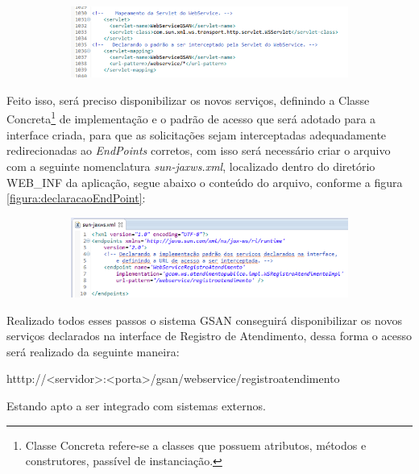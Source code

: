 \begin{figure}[H]
	\centering
	\caption{\textbf{Declaração da servlet do Webservice.}}	
	\label{figura:declaracaoServlet}
	\begin{subfigure}[H]{\textwidth}
		\centering
		\includegraphics{figuras/declarando_servlet.png}
	\end{subfigure}
\end{figure}

Feito isso, será preciso disponibilizar os novos serviços, definindo a Classe Concreta\footnote{Classe Concreta refere-se a classes que possuem atributos, métodos e construtores, passível de instanciação.} de implementação e o padrão de acesso que será adotado para a interface criada, para que as solicitações sejam interceptadas adequadamente redirecionadas ao \textit{EndPoints} corretos, com isso será necessário criar o arquivo com a seguinte nomenclatura \textit{sun-jaxws.xml}, localizado dentro do diretório WEB\_INF da aplicação, segue abaixo o conteúdo do arquivo, conforme a figura \ref{figura:declaracaoEndPoint}:

\begin{figure}[H]
	\centering
	\caption{\textbf{Declaração do \textit{EndPoint} dos serviços.}}	
	\label{figura:declaracaoEndPoint}
	\begin{subfigure}[H]{\textwidth}
		\centering
		\includegraphics{figuras/declaracao_endpoint.png}
	\end{subfigure}
\end{figure}


Realizado todos esses passos o sistema GSAN conseguirá disponibilizar os novos serviços declarados na interface de Registro de Atendimento, dessa forma o acesso será realizado da seguinte maneira:

\begin{description}
	\item htttp://<servidor>:<porta>/gsan/webservice/registroatendimento
\end{description}

Estando apto a ser integrado com sistemas externos. 